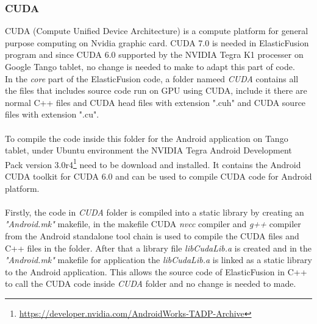 \documentclass[12pt,twoside]{article}
\begin{document}
\subsubsection{CUDA}
CUDA (Compute Unified Device Architecture) is a compute platform for general purpose computing on Nvidia graphic card. CUDA 7.0 is needed in ElasticFusion program and since CUDA 6.0 supported by the NVIDIA Tegra K1 processer on Google Tango tablet, no change is needed to make to adapt this part of code. \\
In the \textit{core} part of the ElasticFusion code, a folder nameed \textit{CUDA} contains all the files that includes source code run on GPU using CUDA, include it there are normal C++ files and CUDA head files with extension ".cuh" and CUDA source files with extension ".cu".\\
\\
To compile the code inside this folder for the Android application on Tango tablet, under Ubuntu environment the NVIDIA Tegra Android Development Pack version 3.0r4\footnote{\url{https://developer.nvidia.com/AndroidWorks-TADP-Archive}} need to be download and installed. It contains the Android CUDA toolkit for CUDA 6.0 and can be used to compile CUDA code for Android platform.\\
\\
Firstly, the code in \textit{CUDA} folder is compiled into a static library by creating an \textit{"Android.mk"} makefile, in the makefile CUDA \textit{nvcc} compiler and \textit{g++} compiler from the Android standalone tool chain is used to compile the CUDA files and C++ files in the folder. After that a library file \textit{libCudaLib.a} is created and in the \textit{"Android.mk"} makefile for application the \textit{libCudaLib.a} is linked as a static library to the Android application. This allows the source code of ElasticFusion in C++ to call the CUDA code inside \textit{CUDA} folder and no change is needed to made.\\
\end{document}
